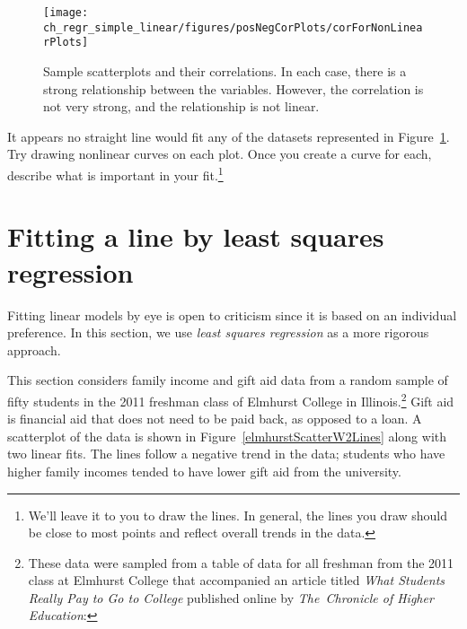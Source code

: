 \begin{figure}
   \centering
   \texttt{[image: ch\_regr\_simple\_linear/figures/posNegCorPlots/corForNonLinearPlots]}
   \caption{Sample scatterplots and their correlations. In each case, there is a strong relationship between the variables. However, the correlation is not very strong, and the relationship is not linear.}
   \label{corForNonLinearPlots}
\end{figure}

\begin{exercise}
It appears no straight line would fit any of the datasets represented in Figure~\ref{corForNonLinearPlots}. Try drawing nonlinear curves on each plot. Once you create a curve for each, describe what is important in your fit.\footnote{We'll leave it to you to draw the lines. In general, the lines you draw should be close to most points and reflect overall trends in the data.}
\end{exercise}


\section[Fitting a line by least squares regression]{Fitting a line by least squares regression }
\label{fittingALineByLSR}


Fitting linear models by eye is open to criticism since it is based on an individual preference. In this section, we use \emph{least squares regression} as a more rigorous approach.

This section considers family income and gift aid data from a random sample of fifty students in the 2011 freshman class of Elmhurst College in Illinois.\footnote{These data were sampled from a table of data for all freshman from the 2011 class at Elmhurst College that accompanied an article titled \emph{What Students Really Pay to Go to College} published online by \emph{The~Chronicle of Higher Education}: } Gift aid is financial aid that does not need to be paid back, as opposed to a loan. A scatterplot of the data is shown in Figure~\ref{elmhurstScatterW2Lines} along with two linear fits. The lines follow a negative trend in the data; students who have higher family incomes tended to have lower gift aid from the university.

